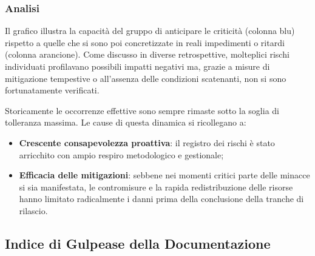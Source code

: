 \documentclass[a4paper,11pt,oneside]{scrartcl}
\begin{document}
\subsubsection*{Analisi}

Il grafico illustra la capacità del gruppo di anticipare le criticità (colonna blu) rispetto a quelle che si sono poi concretizzate in reali impedimenti o ritardi (colonna arancione). Come discusso in diverse retrospettive, molteplici rischi individuati profilavano possibili impatti negativi ma, grazie a misure di mitigazione tempestive o all'assenza delle condizioni scatenanti, non si sono fortunatamente verificati.

Storicamente le occorrenze effettive sono sempre rimaste sotto la soglia di tolleranza massima.
Le cause di questa dinamica si ricollegano a:
\begin{itemize}
    \item \textbf{Crescente consapevolezza proattiva}: il registro dei rischi è stato arricchito con ampio respiro metodologico e gestionale;
    \item \textbf{Efficacia delle mitigazioni}: sebbene nei momenti critici parte delle minacce si sia manifestata, le contromisure e la rapida redistribuzione delle risorse hanno limitato radicalmente i danni prima della conclusione della tranche di rilascio.
\end{itemize}

\subsection{Indice di Gulpease della Documentazione}
\end{document}
